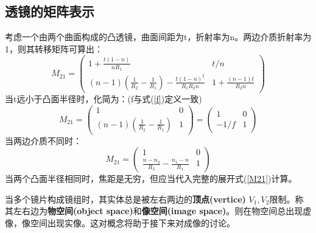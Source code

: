 \documentclass[12pt]{ctexart}%
\begin{document}
\subsection*{透镜的矩阵表示}
考虑一个由两个曲面构成的凸透镜，曲面间距为t，折射率为n。两边介质折射率为1，则其转移矩阵可算出：
\begin{equation}
    M_{21}=\left(\begin{array}{cc}
        1+\frac{t(1-n)}{n R_{1}} & t / n \\
        (n-1)\left(\frac{1}{R_{2}}-\frac{1}{R_{1}}\right)-\frac{t(1-n)^{2}}{R_{1} R_{2} n} & 1+\frac{(n-1) t}{R_{2} n}
        \end{array}\right)
        \label{M21}
\end{equation}
当t远小于凸面半径时，化简为：(f与式(\ref{f})定义一致)
\begin{equation}
    M_{21}=\begin{pmatrix}
        1 & 0 \\
        (n-1)\left(\frac{1}{R_{2}}-\frac{1}{R_{1}}\right) & 1
    \end{pmatrix}=\begin{pmatrix}
        1 & 0 \\
        -1/f & 1
    \end{pmatrix}
\end{equation}
当两边介质不同时：
\begin{equation}
    M_{21}=\begin{pmatrix}
        1 & 0 \\
        \frac{n-n_2}{R_2}-\frac{n_1-n}{R_1} & 1
    \end{pmatrix}
\end{equation}
当两个凸面半径相同时，焦距是无穷，但应当代入完整的展开式(\ref{M21})计算。
\par 当多个镜片构成镜组时，其实体总是被左右两边的\textbf{顶点(vertice)} $V_1,V_2$限制。称其左右边为\textbf{物空间(object space)}和\textbf{像空间(image space)}。则在物空间总出现虚像，像空间出现实像。这对概念将助于接下来对成像的讨论。
\end{document}
